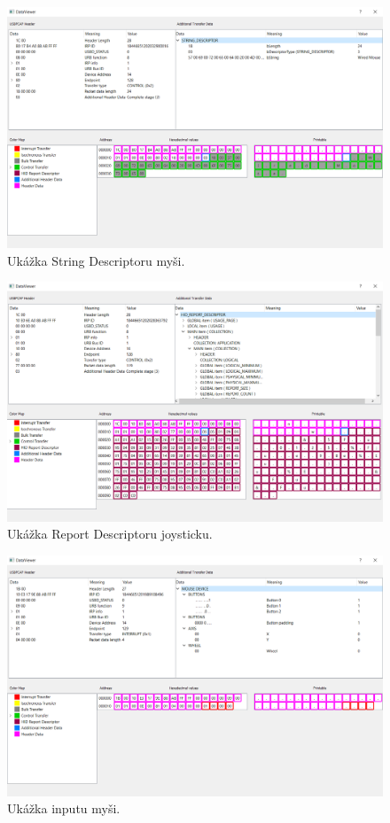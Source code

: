 \begin{figure}[!htb]
	\centering
	\includegraphics[width=\textwidth]{img/kap06_uk_string_descriptor}
	\caption{Ukážka String Descriptoru myši.}
	\label{obr:kap6:uk_string_desc}
\end{figure}

\begin{figure}[!htb]
	\centering
	\includegraphics[width=\textwidth]{img/kap06_uk_report_desc}
	\caption{Ukážka Report Descriptoru joysticku.}
	\label{obr:kap6:uk_report_desc}
\end{figure}

\begin{figure}[!htb]
	\centering
	\includegraphics[width=\textwidth]{img/kap06_uk_mouse}
	\caption{Ukážka inputu myši.}
	\label{obr:kap6:uk_input_mouse}
\end{figure}

